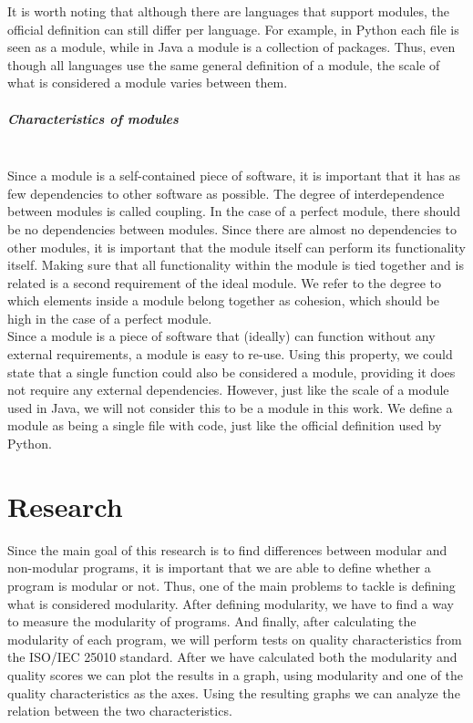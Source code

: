 \documentclass[twoside]{uva-inf-bachelor-thesis}
\newcommand{\myparagraph}[1]{\paragraph{#1}\mbox{}\\}
\begin{document}
It is worth noting that although there are languages that support modules, the official definition can still differ per language. For example, in Python each file is seen as a module\cite{pythonmodules}, while in Java a module is a collection of packages\cite{javamodules}. Thus, even though all languages use the same general definition of a module, the scale of what is considered a module varies between them.

\myparagraph{Characteristics of modules}
Since a module is a self-contained piece of software, it is important that it has as few dependencies to other software as possible. The degree of interdependence between modules is called coupling\cite{ISO24765}. In the case of a perfect module, there should be no dependencies between modules. Since there are almost no dependencies to other modules, it is important that the module itself can perform its functionality itself. Making sure that all functionality within the module is tied together and is related is a second requirement of the ideal module. We refer to the degree to which elements inside a module belong together as cohesion\cite{yourdon1979structured}, which should be high in the case of a perfect module.\\

Since a module is a piece of software that (ideally) can function without any external requirements, a module is easy to re-use. Using this property, we could state that a single function could also be considered a module, providing it does not require any external dependencies. However, just like the scale of a module used in Java\cite{javamodules}, we will not consider this to be a module in this work. We define a module as being a single file with code, just like the official definition used by Python\cite{pythonmodules}.

\chapter{Research}
Since the main goal of this research is to find differences between modular and non-modular programs, it is important that we are able to define whether a program is modular or not. Thus, one of the main problems to tackle is defining what is considered modularity. After defining modularity, we have to find a way to measure the modularity of programs. And finally, after calculating the modularity of each program, we will perform tests on quality characteristics from the ISO/IEC 25010 standard\cite{ISO25010}. After we have calculated both the modularity and quality scores we can plot the results in a graph, using modularity and one of the quality characteristics as the axes. Using the resulting graphs we can analyze the relation between the two characteristics.\\
\end{document}
